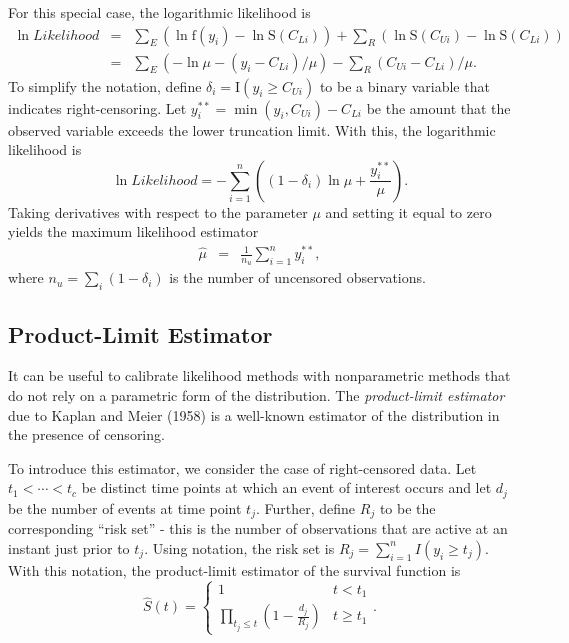 For this special case, the logarithmic likelihood is
\begin{eqnarray*}
 \ln Likelihood  &=& \sum_{E} \left( \ln \mathrm{f}(y_i) - \ln
\mathrm{S}(C_{Li}) \right)
 +\sum_{R}\left( \ln \mathrm{S}(C_{Ui})- \ln \mathrm{S}(C_{Li})
 \right) \\
 &=&  \sum_{E} (-\ln \mu -(y_i-C_{Li})/\mu )
-\sum_{R} (C_{Ui}-C_{Li})/\mu .
\end{eqnarray*}
To simplify the notation, define $\delta_i = \mathrm{I}(y_i \geq
C_{Ui})$ to be a binary variable that indicates right-censoring. Let
$y_i^{\ast \ast} = \min(y_i, C_{Ui}) - C_{Li}$ be the amount that
the observed variable exceeds the lower truncation limit. With this,
the logarithmic likelihood is
\begin{equation}\label{E14:ExponentialLike}
 \ln Likelihood =  - \sum_{i=1}^n ((1-\delta_i) \ln \mu + \frac{y_i^{\ast
 \ast}}{\mu} ).
\end{equation}
Taking derivatives with respect to the parameter $\mu$ and setting
it equal to zero yields the maximum likelihood estimator
\begin{eqnarray*}
\widehat{\mu}
 &=& \frac{1}{n_u} \sum_{i=1}^n  y_i^{\ast
 \ast},
\end{eqnarray*}
where $n_u = \sum_i (1-\delta_i)$ is the number of uncensored
observations.

\linejed


\subsection{Product-Limit Estimator}

It can be useful to calibrate likelihood methods with nonparametric
methods that do not rely on a parametric form of the distribution.
The \emph{product-limit estimator }due to Kaplan and Meier (1958) is
a well-known estimator of the distribution in the presence of
censoring.

To introduce this estimator, we consider the case of
right-censored data. Let $t_1 < \cdots < t_c$ be distinct time
points at which an event of interest occurs and let $d_j$ be the
number of events at time point $t_j$. Further, define $R_j$ to be
the corresponding ``risk set'' - this is the number of observations
that are active at an instant just prior to $t_j$. Using notation,
the risk set is $R_j = \sum_{i=1}^n I\left( y_i \geq
 t_j \right)$. With this notation, the product-limit estimator of
the survival function is
\begin{equation}\label{E14:ProductLimit}
\widehat{S}(t) = \left\{
\begin{array}{ll}
 1 & t<t_1 \\
  \prod_{t_j \leq t} \left(1 - \frac{d_j}{R_j}
\right)
   & t \geq t_1
\end{array}
\right. .
\end{equation}

